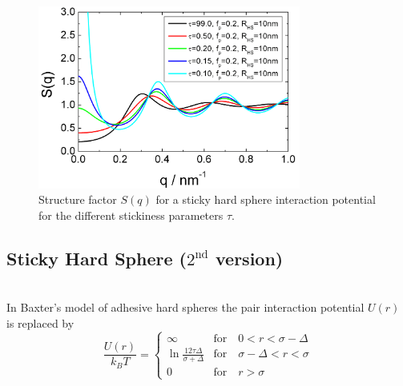 \begin{figure}[htb]
\begin{center}
\includegraphics[width=0.768\textwidth]{../images/structure_factor/HardSphere/StickyHardSphere1.png}
\end{center}
\caption{Structure factor $S(q)$ for a sticky hard sphere interaction potential for the different
stickiness parameters $\tau$.}
\label{fig:SQStickyHardSphere1}
\end{figure}

\clearpage
\subsection{Sticky Hard Sphere ($2^\text{nd}$ version)} \cite{Regnaut1989,Regnaut1990}~\\

In Baxter's model of adhesive hard spheres the pair interaction
potential $U(r)$ is replaced by
\begin{equation}
\frac{U(r)}{k_BT} =
 \begin{cases}
      \infty    & \text{for} \quad 0<r<\sigma-\Delta \\
      \ln\frac{12\tau\Delta}{\sigma+\Delta} & \text{for} \quad \sigma-\Delta<r<\sigma \\
      0         & \text{for} \quad r>\sigma
   \end{cases}
\end{equation}



